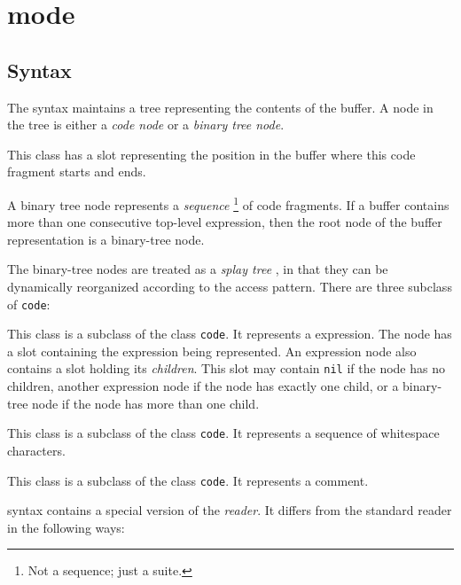 \chapter{\commonlisp{} mode}
\label{chap-internals-common-lisp-mode}

\section{Syntax}

The \commonlisp{} syntax maintains a tree representing the contents of
the buffer.  A node in the tree is either a \emph{code node} or
a \emph{binary tree node}.


This class has a slot representing the position in the buffer where
this code fragment starts and ends.


A binary tree node represents a \emph{sequence}%
\footnote{Not a \commonlisp{} sequence; just a suite.}  of code
fragments.  If a buffer contains more than one consecutive top-level
expression, then the root node of the buffer representation is a
binary-tree node.

The binary-tree nodes are treated as a \emph{splay tree}
\cite{Sleator:1985:SBS:3828.3835}, in that they can be dynamically
reorganized according to the access pattern.
There are three subclass of \texttt{code}:


This class is a subclass of the class \texttt{code}.  It represents a
\commonlisp{} expression.  The node has a slot containing the
expression being represented.  An expression node also
contains a slot holding its \emph{children}.  This slot may contain
\texttt{nil} if the node has no children, another expression node if
the node has exactly one child, or a binary-tree node if the node has
more than one child.


This class is a subclass of the class \texttt{code}.  It represents a
sequence of whitespace characters.


This class is a subclass of the class \texttt{code}.  It represents a
\commonlisp{} comment.

\commonlisp{} syntax contains a special version of the \commonlisp{}
\emph{reader}.  It differs from the standard reader in the following
ways:

